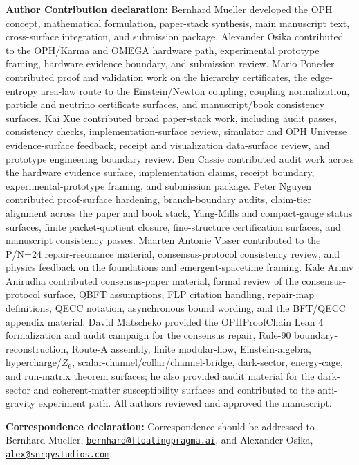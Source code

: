 \documentclass[11pt]{article}
\begin{document}
\noindent\textbf{Author Contribution declaration:} Bernhard Mueller developed the OPH concept,
mathematical formulation, paper-stack synthesis, main manuscript text, cross-surface integration, and
submission package. Alexander Osika contributed to the OPH/Karma and OMEGA hardware path,
experimental prototype framing, hardware evidence boundary, and submission review. Mario Poneder
contributed proof and validation work on the hierarchy certificates, the edge-entropy area-law
route to the Einstein/Newton coupling, coupling normalization, particle and neutrino certificate
surfaces, and manuscript/book consistency surfaces. Kai Xue contributed broad paper-stack work,
including audit passes, consistency checks, implementation-surface review, simulator and OPH
Universe evidence-surface feedback, receipt and visualization data-surface review, and prototype
engineering boundary review. Ben Cassie contributed audit work across the hardware evidence
surface, implementation claims, receipt boundary, experimental-prototype framing, and submission
package. Peter Nguyen contributed proof-surface hardening, branch-boundary audits, claim-tier
alignment across the paper and book stack, Yang-Mills and compact-gauge status surfaces, finite
packet-quotient closure, fine-structure certification surfaces, and manuscript consistency passes.
Maarten Antonie Visser contributed to the P/N=24 repair-resonance material, consensus-protocol
consistency review, and physics feedback on the foundations and emergent-spacetime framing. Kale
Arnav Anirudha contributed consensus-paper material, formal review of the consensus-protocol
surface, QBFT assumptions, FLP citation handling, repair-map definitions, QECC notation,
asynchronous bound wording, and the BFT/QECC appendix material. David Matscheko provided the
OPHProofChain Lean 4 formalization and audit campaign for the consensus repair, Rule-90
boundary-reconstruction, Route-A assembly, finite modular-flow, Einstein-algebra,
hypercharge/\(Z_6\), scalar-channel/collar/channel-bridge, dark-sector, energy-cage, and
run-matrix theorem surfaces; he also provided audit material for the dark-sector and
coherent-matter susceptibility surfaces and contributed to the anti-gravity experiment path. All
authors reviewed and approved the manuscript.

\noindent\textbf{Correspondence declaration:} Correspondence should be addressed to Bernhard
Mueller, \href{mailto:bernhard@floatingpragma.ai}{\texttt{bernhard@floatingpragma.ai}}, and
Alexander Osika, \href{mailto:alex@snrgystudios.com}{\texttt{alex@snrgystudios.com}}.
\end{document}

